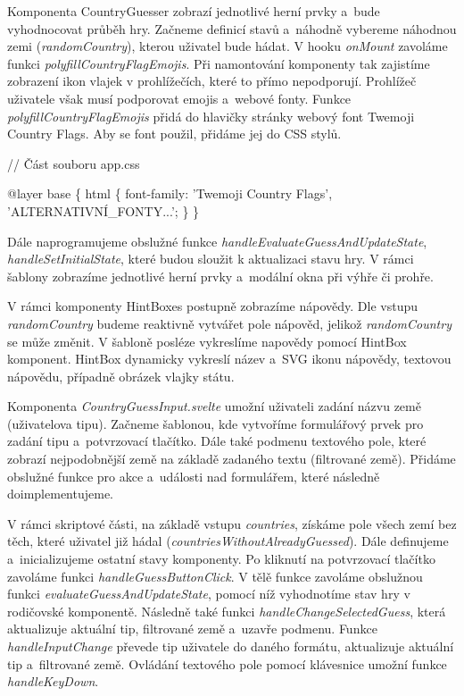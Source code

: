 Komponenta CountryGuesser zobrazí jednotlivé herní prvky a~bude vyhodnocovat průběh hry. 
Začneme definicí stavů a~náhodně vybereme náhodnou zemi (\emph{randomCountry}), kterou uživatel bude hádat. 
V hooku \emph{onMount} zavoláme funkci \emph{polyfillCountryFlagEmojis}. Při namontování komponenty tak zajistíme zobrazení ikon vlajek v prohlížečích, které to přímo nepodporují. 
Prohlížeč uživatele však musí podporovat emojis a~webové fonty. Funkce \emph{polyfillCountryFlagEmojis} přidá do hlavičky stránky webový font Twemoji Country Flags. 
Aby se font použil, přidáme jej do CSS stylů.

\begin{prog}
// Část souboru app.css

@layer base \{
  html \{
    font-family: 'Twemoji Country Flags', 'ALTERNATIVNÍ_FONTY...';
  \}
\}
\end{prog}

Dále naprogramujeme obslužné funkce \emph{handleEvaluateGuessAndUpdateState}, \emph{handleSetInitialState}, které budou sloužit k aktualizaci stavu hry. 
V rámci šablony zobrazíme jednotlivé herní prvky a~modální okna při výhře či prohře.

V rámci komponenty HintBoxes postupně zobrazíme nápovědy. Dle vstupu \emph{randomCountry} budeme reaktivně vytvářet pole nápověd, jelikož \emph{randomCountry} se může změnit. 
V šabloně posléze vykreslíme napovědy pomocí HintBox komponent. HintBox dynamicky vykreslí název a~SVG ikonu nápovědy, textovou nápovědu, případně obrázek vlajky státu.

Komponenta \emph{CountryGuessInput.svelte} umožní uživateli zadání názvu země (uživatelova tipu). Začneme šablonou, kde vytvoříme formulářový prvek pro zadání tipu a~potvrzovací tlačítko. 
Dále také podmenu textového pole, které zobrazí nejpodobnější země na základě zadaného textu (filtrované země). Přidáme obslužné funkce pro akce a~události nad formulářem, které následně doimplementujeme.

V rámci skriptové části, na základě vstupu \emph{countries}, získáme pole všech zemí bez těch, které uživatel již hádal (\emph{countriesWithoutAlreadyGuessed}). 
Dále definujeme a~inicializujeme ostatní stavy komponenty. Po kliknutí na potvrzovací tlačítko zavoláme funkci \emph{handleGuessButtonClick}. 
V tělě funkce zavoláme obslužnou funkci \emph{evaluateGuessAndUpdateState}, pomocí níž vyhodnotíme stav hry v rodičovské komponentě. 
Následně také funkci \emph{handleChangeSelectedGuess}, která aktualizuje aktuální tip, filtrované země a~uzavře podmenu. 
Funkce \emph{handleInputChange} převede tip uživatele do daného formátu, aktualizuje aktuální tip a~filtrované země. Ovládání textového pole pomocí klávesnice umožní funkce \emph{handleKeyDown}.

